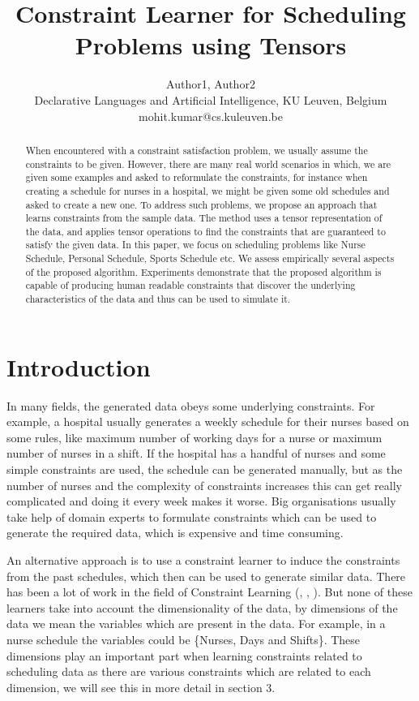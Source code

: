 \documentclass{article}
\title{Constraint Learner for Scheduling Problems using Tensors}
\author{Author1, Author2\\ 
Declarative Languages and Artificial Intelligence, KU Leuven, Belgium  \\
mohit.kumar@cs.kuleuven.be}
\begin{document}
\maketitle

\begin{abstract}
When encountered with a constraint satisfaction problem, we usually assume the constraints to be given. However, there are many real world scenarios in which, we are given some examples and asked to reformulate the constraints, for instance when creating a schedule for nurses in a hospital, we might be given some old schedules and asked to create a new one. To address such problems, we propose an approach that learns constraints from the sample data. 
The method uses a tensor representation of the data, and applies tensor operations to find the constraints that are guaranteed to satisfy the given data. In this paper, we focus on scheduling problems like Nurse Schedule, Personal Schedule, Sports Schedule etc. We assess empirically several aspects of the proposed algorithm. Experiments demonstrate that the proposed algorithm is capable of producing human readable constraints that discover the underlying characteristics of the data and thus can be used to simulate it.
\end{abstract}

\section{Introduction}
In many fields, the generated data obeys some underlying constraints. For example, a hospital usually generates a weekly schedule for their nurses based on some rules, like maximum number of working days for a nurse or maximum number of nurses in a shift. If the hospital has a handful of nurses and some simple constraints are used, the schedule can be generated manually, but as the number of nurses and the complexity of constraints increases this can get really complicated and doing it every week makes it worse. Big organisations usually take help of domain experts to formulate constraints which can be used to generate the required data, which is expensive and time consuming.

An alternative approach is to use a constraint learner to induce the constraints from the past schedules, which then can be used to generate similar data. There has been a lot of work in the field of Constraint Learning (\cite{TaCLe}, \cite{ModelSeeker}, \cite{MILP}). But none of these learners take into account the dimensionality of the data, by dimensions of the data we mean the variables which are present in the data. For example, in a nurse schedule the variables could be \{Nurses, Days and Shifts\}. These dimensions play an important part when learning constraints related to scheduling data as there are various constraints which are related to each dimension, we will see this in more detail in section 3.
\end{document}
